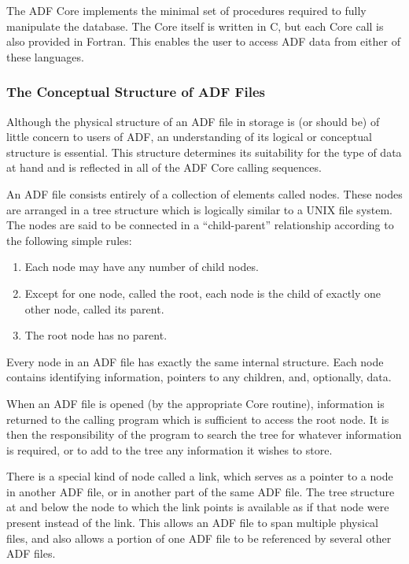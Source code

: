 The ADF Core implements the minimal set of procedures required to fully
manipulate the database. The Core itself is written in C, but each Core
call is also provided in Fortran. This enables the user to access ADF
data from either of these languages.

\subsubsection{The Conceptual Structure of ADF Files}

Although the physical structure of an ADF file in storage is (or should
be) of little concern to users of ADF, an understanding of its logical
or conceptual structure is essential. This structure determines its
suitability for the type of data at hand and is reflected in all of the
ADF Core calling sequences.

An ADF file consists entirely of a collection of elements called
nodes. These nodes are arranged in a tree structure which is logically
similar to a UNIX file system. The nodes are said to be connected in a
``child-parent'' relationship according to the following simple rules:

\begin{enumerate}
\item Each node may have any number of child nodes.
\item Except for one node, called the root, each node is the child of
      exactly one other node, called its parent.
\item The root node has no parent.
\end{enumerate}

Every node in an ADF file has exactly the same internal structure. Each
node contains identifying information, pointers to any children, and,
optionally, data.

When an ADF file is opened (by the appropriate Core routine),
information is returned to the calling program which is sufficient to
access the root node. It is then the responsibility of the program to
search the tree for whatever information is required, or to add to the
tree any information it wishes to store.

There is a special kind of node called a link, which serves as a pointer
to a node in another ADF file, or in another part of the same ADF
file. The tree structure at and below the node to which the link points
is available as if that node were present instead of the link. This
allows an ADF file to span multiple physical files, and also allows a
portion of one ADF file to be referenced by several other ADF files.

